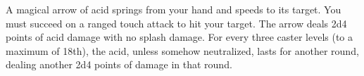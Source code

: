 \spelldatastart
{}
\spellrange{\longrange}
\spelldataend

A magical arrow of acid springs from your hand and speeds to its target. You must succeed on a ranged touch attack to hit your target. The arrow deals 2d4 points of acid damage with no splash damage. For every three caster levels (to a maximum of 18th), the acid, unless somehow neutralized, lasts for another round, dealing another 2d4 points of damage in that round.


\spellfoot
